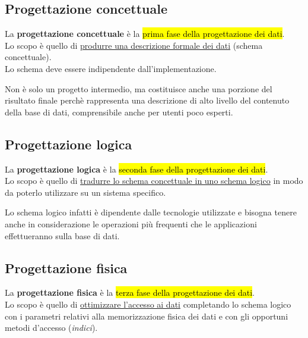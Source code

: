 \documentclass[12pt, a4paper, oneside]{book}
\begin{document}
    \subsection{Progettazione concettuale}
    La \textcolor{azzurrino}{\textbf{progettazione concettuale}} è la \hl{prima fase della progettazione dei dati}.\\[0.2ex]
    Lo scopo è quello di \underline{produrre una descrizione formale dei dati} (schema concettuale).\\[0.2ex] 
    Lo schema deve essere indipendente dall’implementazione.

    Non è solo un progetto intermedio, ma costituisce anche una porzione del risultato finale perchè rappresenta una descrizione di alto livello del contenuto della base di dati, comprensibile anche per utenti poco esperti.

    \subsection{Progettazione logica}
    La \textcolor{azzurrino}{\textbf{progettazione logica}} è la \hl{seconda fase della progettazione dei dati}.\\[0.2ex]
    Lo scopo è quello di \underline{tradurre lo schema concettuale in uno schema logico} in modo da poterlo utilizzare su un sistema specifico.
    
    Lo schema logico infatti è dipendente dalle tecnologie utilizzate e bisogna tenere anche in considerazione le operazioni più frequenti che le applicazioni effettueranno sulla base di dati.

    \subsection{Progettazione fisica}
    La \textcolor{azzurrino}{\textbf{progettazione fisica}} è la \hl{terza fase della progettazione dei dati}.\\[0.2ex]
    Lo scopo è quello di \underline{ottimizzare l’accesso ai dati} completando lo schema logico con i parametri relativi alla memorizzazione fisica dei dati e con gli opportuni metodi d’accesso (\textit{indici}).
\end{document}

